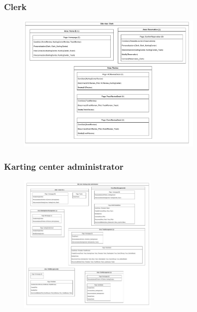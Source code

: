 \documentclass{beamer}
\begin{document}
\begin{frame}
    \frametitle{Clerk}
    \begin{figure}
        \centering
        \includegraphics[width=0.8\textwidth]{drawio/clerk-view.pdf}
    \end{figure}
\end{frame}

\begin{frame}
    \frametitle{Karting center administrator}
    \begin{figure}
        \centering
        \includegraphics[width=0.6\textwidth]{drawio/karting-center-admin-view.pdf}
    \end{figure}
\end{frame}
\end{document}
